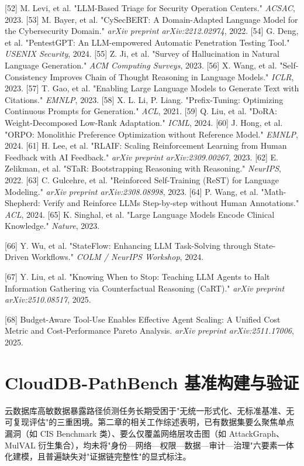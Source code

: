 \documentclass[a4paper,12pt]{ctexart}
\begin{document}
[52] M. Levi, et al. "LLM-Based Triage for Security Operation Centers." \textit{ACSAC}, 2023.
[53] M. Bayer, et al. "CySecBERT: A Domain-Adapted Language Model for the Cybersecurity Domain." \textit{arXiv preprint arXiv:2212.02974}, 2022.
[54] G. Deng, et al. "PentestGPT: An LLM-empowered Automatic Penetration Testing Tool." \textit{USENIX Security}, 2024.
[55] Z. Ji, et al. "Survey of Hallucination in Natural Language Generation." \textit{ACM Computing Surveys}, 2023.
[56] X. Wang, et al. "Self-Consistency Improves Chain of Thought Reasoning in Language Models." \textit{ICLR}, 2023.
[57] T. Gao, et al. "Enabling Large Language Models to Generate Text with Citations." \textit{EMNLP}, 2023.
[58] X. L. Li, P. Liang. "Prefix-Tuning: Optimizing Continuous Prompts for Generation." \textit{ACL}, 2021.
[59] Q. Liu, et al. "DoRA: Weight-Decomposed Low-Rank Adaptation." \textit{ICML}, 2024.
[60] J. Hong, et al. "ORPO: Monolithic Preference Optimization without Reference Model." \textit{EMNLP}, 2024.
[61] H. Lee, et al. "RLAIF: Scaling Reinforcement Learning from Human Feedback with AI Feedback." \textit{arXiv preprint arXiv:2309.00267}, 2023.
[62] E. Zelikman, et al. "STaR: Bootstrapping Reasoning with Reasoning." \textit{NeurIPS}, 2022.
[63] C. Gulcehre, et al. "Reinforced Self-Training (ReST) for Language Modeling." \textit{arXiv preprint arXiv:2308.08998}, 2023.
[64] P. Wang, et al. "Math-Shepherd: Verify and Reinforce LLMs Step-by-step without Human Annotations." \textit{ACL}, 2024.
[65] K. Singhal, et al. "Large Language Models Encode Clinical Knowledge." \textit{Nature}, 2023.

[66] Y. Wu, et al. "StateFlow: Enhancing LLM Task-Solving through State-Driven Workflows." \textit{COLM / NeurIPS Workshop}, 2024.

[67] Y. Liu, et al. "Knowing When to Stop: Teaching LLM Agents to Halt Information Gathering via Counterfactual Reasoning (CaRT)." \textit{arXiv preprint arXiv:2510.08517}, 2025.

[68] Budget-Aware Tool-Use Enables Effective Agent Scaling: A Unified Cost Metric and Cost-Performance Pareto Analysis. \textit{arXiv preprint arXiv:2511.17006}, 2025.



\section{CloudDB-PathBench 基准构建与验证}

云数据库高敏数据暴露路径侦测任务长期受困于"无统一形式化、无标准基准、无可复现评估"的三重困境。第二章的相关工作综述表明，已有数据集要么聚焦单点漏洞（如 CIS Benchmark 类）、要么仅覆盖网络层攻击图（如 AttackGraph、MulVAL 衍生集合），均未将"身份—网络—权限—数据—审计—治理"六要素一体化建模，且普遍缺失对"证据链完整性"的显式标注。
\end{document}

